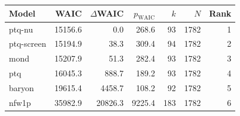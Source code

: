 \begin{tabular}{lrrrrrr}
\toprule
Model & WAIC & $\Delta$WAIC & $p_{\mathrm{WAIC}}$ & $k$ & $N$ & Rank \\
\midrule
ptq-nu & 15156.6 & 0.0 & 268.6 & 93 & 1782 & 1 \\
ptq-screen & 15194.9 & 38.3 & 309.4 & 94 & 1782 & 2 \\
mond & 15207.9 & 51.3 & 282.4 & 93 & 1782 & 3 \\
ptq & 16045.3 & 888.7 & 189.2 & 93 & 1782 & 4 \\
baryon & 19615.4 & 4458.7 & 108.2 & 92 & 1782 & 5 \\
nfw1p & 35982.9 & 20826.3 & 9225.4 & 183 & 1782 & 6 \\
\bottomrule
\end{tabular}
